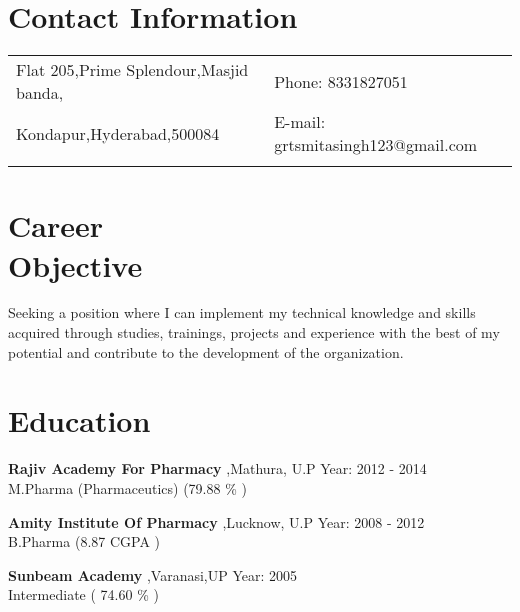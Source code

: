 \documentclass[margin,line]{res}
\begin{document}


\begin{resume}
\section{\sc Contact Information}

\vspace{.05in}
\begin{tabular}{@{}p{3.5in}p{3in}}
Flat 205,Prime Splendour,Masjid banda,                & {Phone:}  8331827051 \\
Kondapur,Hyderabad,500084                               & {E-mail:}  grtsmitasingh123@gmail.com\\
\\
\end{tabular}


\section{\sc Career \\Objective}
Seeking a position where I can implement my technical knowledge and skills acquired through studies, trainings, projects and experience with the best of my potential and contribute to the development of the organization.\\




\section{\sc Education}

{\bf Rajiv Academy For Pharmacy} ,Mathura, U.P \hfill Year: 2012 - 2014\\
M.Pharma (Pharmaceutics) \hfill(79.88 \% )

{\bf Amity Institute Of Pharmacy} ,Lucknow, U.P \hfill Year: 2008 - 2012\\
B.Pharma \hfill(8.87 CGPA )

{\bf Sunbeam Academy },Varanasi,UP \hfill Year: 2005 \\
Intermediate \hfill( 74.60 \% )


\end{resume}
\end{document}

